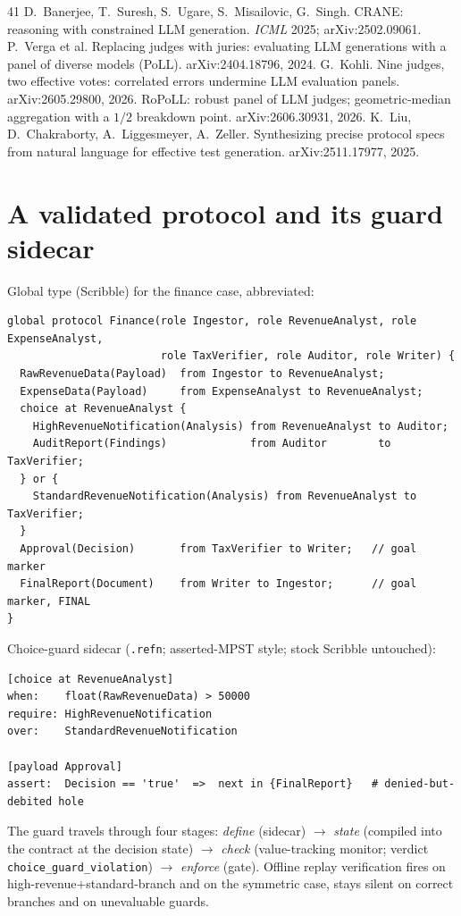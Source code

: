 \documentclass{article}
\begin{document}
\begin{thebibliography}{41}
 D.~Banerjee, T.~Suresh, S.~Ugare, S.~Misailovic, G.~Singh. CRANE: reasoning with constrained LLM generation. \emph{ICML} 2025; arXiv:2502.09061.
 P.~Verga et al. Replacing judges with juries: evaluating LLM generations with a panel of diverse models (PoLL). arXiv:2404.18796, 2024.
 G.~Kohli. Nine judges, two effective votes: correlated errors undermine LLM evaluation panels. arXiv:2605.29800, 2026.
 RoPoLL: robust panel of LLM judges; geometric-median aggregation with a $1/2$ breakdown point. arXiv:2606.30931, 2026.
 K.~Liu, D.~Chakraborty, A.~Liggesmeyer, A.~Zeller. Synthesizing precise protocol specs from natural language for effective test generation. arXiv:2511.17977, 2025.
\end{thebibliography}

\appendix
\section{A validated protocol and its guard sidecar}\label{app:scr}
Global type (Scribble) for the finance case, abbreviated:
{\small\begin{verbatim}
global protocol Finance(role Ingestor, role RevenueAnalyst, role ExpenseAnalyst,
                        role TaxVerifier, role Auditor, role Writer) {
  RawRevenueData(Payload)  from Ingestor to RevenueAnalyst;
  ExpenseData(Payload)     from ExpenseAnalyst to RevenueAnalyst;
  choice at RevenueAnalyst {
    HighRevenueNotification(Analysis) from RevenueAnalyst to Auditor;
    AuditReport(Findings)             from Auditor        to TaxVerifier;
  } or {
    StandardRevenueNotification(Analysis) from RevenueAnalyst to TaxVerifier;
  }
  Approval(Decision)       from TaxVerifier to Writer;   // goal marker
  FinalReport(Document)    from Writer to Ingestor;      // goal marker, FINAL
}
\end{verbatim}}
Choice-guard sidecar (\texttt{.refn}; asserted-MPST style; stock Scribble untouched):
{\small\begin{verbatim}
[choice at RevenueAnalyst]
when:    float(RawRevenueData) > 50000
require: HighRevenueNotification
over:    StandardRevenueNotification

[payload Approval]
assert:  Decision == 'true'  =>  next in {FinalReport}   # denied-but-debited hole
\end{verbatim}}
The guard travels through four stages: \emph{define} (sidecar) $\to$ \emph{state} (compiled into the contract at the decision state) $\to$ \emph{check} (value-tracking monitor; verdict \texttt{choice\_guard\_violation}) $\to$ \emph{enforce} (gate). Offline replay verification fires on high-revenue$+$standard-branch and on the symmetric case, stays silent on correct branches and on unevaluable guards.
\end{document}
